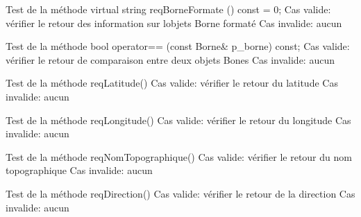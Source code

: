 \begin{DoxyRefList}
\item[Member \mbox{\hyperlink{_borne_testeur_8cpp_aa39d698cacef99f88cb734a68e84148e}{T\+E\+S\+T\+\_\+F}} (\mbox{\hyperlink{class_un_borne}{Un\+Borne}}, req\+Borne\+Formate)]\label{test__test000014}%
%
Test de la méthode virtual string req\+Borne\+Formate () const = 0; Cas valide\+: vérifier le retour des information sur l\textquotesingle{}objets Borne formaté Cas invalide\+: aucun  
\item[Member \mbox{\hyperlink{_borne_testeur_8cpp_af5cff7ce14ea6529e096d3dc5120230f}{T\+E\+S\+T\+\_\+F}} (\mbox{\hyperlink{class_un_borne}{Un\+Borne}}, Comparaion\+Deux\+Borne\+Cas\+Egeaux)]\label{test__test000013}%
%
Test de la méthode bool operator== (const Borne\& p\+\_\+borne) const; Cas valide\+: vérifier le retour de comparaison entre deux objets Bones Cas invalide\+: aucun  
\item[Member \mbox{\hyperlink{_borne_testeur_8cpp_a19a8dbb20f66a00191f396e7ce0b242f}{T\+E\+S\+T\+\_\+F}} (\mbox{\hyperlink{class_un_borne}{Un\+Borne}}, req\+Latitude)]\label{test__test000012}%
%
Test de la méthode req\+Latitude() Cas valide\+: vérifier le retour du latitude Cas invalide\+: aucun  
\item[Member \mbox{\hyperlink{_borne_testeur_8cpp_a5b1f87b203fc3145764960c83e08c3c3}{T\+E\+S\+T\+\_\+F}} (\mbox{\hyperlink{class_un_borne}{Un\+Borne}}, req\+Longitude)]\label{test__test000011}%
%
Test de la méthode req\+Longitude() Cas valide\+: vérifier le retour du longitude Cas invalide\+: aucun  
\item[Member \mbox{\hyperlink{_borne_testeur_8cpp_a39d0a3cbd85655bff638ddb00f5d5711}{T\+E\+S\+T\+\_\+F}} (\mbox{\hyperlink{class_un_borne}{Un\+Borne}}, req\+Nom\+Topographique)]\label{test__test000010}%
%
Test de la méthode req\+Nom\+Topographique() Cas valide\+: vérifier le retour du nom topographique Cas invalide\+: aucun  
\item[Member \mbox{\hyperlink{_borne_testeur_8cpp_a25b6fad77b561dfd076e207bd165c556}{T\+E\+S\+T\+\_\+F}} (\mbox{\hyperlink{class_un_borne}{Un\+Borne}}, req\+Direction)]\label{test__test000009}%
%
Test de la méthode req\+Direction() Cas valide\+: vérifier le retour de la direction Cas invalide\+: aucun  
\item[Member \mbox{\hyperlink{_borne_testeur_8cpp_a3ee6b74f30331c52bf8c4e27b93a33e2}{T\+E\+S\+T\+\_\+F}} (\mbox{\hyperlink{class_un_borne}{Un\+Borne}}, req\+Identifiant)]\label{test__test000008}%

\end{DoxyRefList}
